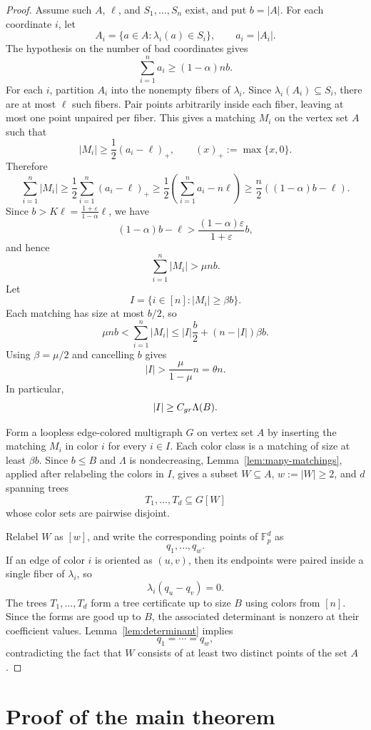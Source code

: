 \documentclass[10pt,a4paper]{amsart}
\newcommand{\Fp}{\mathbb{F}_p}
\begin{document}
\begin{proof}
Assume such $A$, $\ell$, and $S_1,\ldots,S_n$ exist, and put $b=|A|$. For each coordinate $i$, let
\[
A_i=\{a\in A:\lambda_i(a)\in S_i\},
\qquad
 a_i=|A_i|.
\]
The hypothesis on the number of bad coordinates gives
\[
\sum_{i=1}^n a_i\ge (1-\alpha)nb.
\]
For each $i$, partition $A_i$ into the nonempty fibers of $\lambda_i$. Since $\lambda_i(A_i)\subseteq S_i$, there are at most $\ell$ such fibers. Pair points arbitrarily inside each fiber, leaving at most one point unpaired per fiber. This gives a matching $M_i$ on the vertex set $A$ such that
\[
|M_i|\ge \frac12(a_i-\ell)_+,
\qquad (x)_+:=\max\{x,0\}.
\]
Therefore
\[
\sum_{i=1}^n |M_i|
\ge \frac12\sum_{i=1}^n(a_i-\ell)_+
\ge \frac12\left(\sum_{i=1}^n a_i-n\ell\right)
\ge \frac n2((1-\alpha)b-\ell).
\]
Since $b>K\ell=\frac{1+\varepsilon}{1-\alpha}\ell$, we have
\[
(1-\alpha)b-\ell
>
\frac{(1-\alpha)\varepsilon}{1+\varepsilon}b,
\]
and hence
\[
\sum_{i=1}^n |M_i|>\mu nb.
\]
Let
\[
I=\{i\in[n]: |M_i|\ge \beta b\}.
\]
Each matching has size at most $b/2$, so
\[
\mu nb
<\sum_{i=1}^n |M_i|
\le |I|\frac b2+(n-|I|)\beta b.
\]
Using $\beta=\mu/2$ and cancelling $b$ gives
\[
|I|>\frac{\mu}{1-\mu}n=\theta n.
\]
In particular,
\[
|I|\ge C_{\rm gr}\Lambda(B).
\]

Form a loopless edge-colored multigraph $G$ on vertex set $A$ by inserting the matching $M_i$ in color $i$ for every $i\in I$. Each color class is a matching of size at least $\beta b$. Since $b\le B$ and $\Lambda$ is nondecreasing, Lemma~\ref{lem:many-matchings}, applied after relabeling the colors in $I$, gives a subset $W\subseteq A$, $w:=|W|\ge2$, and $d$ spanning trees
\[
T_1,\ldots,T_d\subseteq G[W]
\]
whose color sets are pairwise disjoint.

Relabel $W$ as $[w]$, and write the corresponding points of $\Fp^d$ as
\[
q_1,\ldots,q_w.
\]
If an edge of color $i$ is oriented as $(u,v)$, then its endpoints were paired inside a single fiber of $\lambda_i$, so
\[
\lambda_i(q_u-q_v)=0.
\]
The trees $T_1,\ldots,T_d$ form a tree certificate up to size $B$ using colors from $[n]$. Since the forms are good up to $B$, the associated determinant is nonzero at their coefficient values. Lemma~\ref{lem:determinant} implies
\[
q_1=\cdots=q_w,
\]
contradicting the fact that $W$ consists of at least two distinct points of the set $A$.
\end{proof}

\section{Proof of the main theorem}
\end{document}
